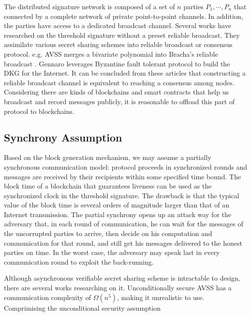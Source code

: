\documentclass[11pt]{article}
\begin{document}
The distributed signature network is composed of a set of $n$ parties $P_1, \cdots, P_n$ that connected by a complete network of private point-to-point channels. In addition, the parties have access to a dedicated broadcast channel. Several works\cite{kate2009distributed,kate2012distributed,cachin2002asynchronous} have researched on the threshold signature without a preset reliable broadcast. They assimilate various secret sharing schemes into reliable broadcast or consensus protocol. e.g. AVSS\cite{cachin2002asynchronous} merges a bivariate polynomial into Bracha’s reliable broadcast \cite{bracha1984asynchronous}. Gennaro\cite{gennaro2007secure} leverages Byzantine fault tolerant protocol\cite{castro1999practical} to build the DKG for the Internet. It can be concluded from these articles that constructing a reliable broadcast channel is equivalent to reaching a consensus among nodes. Considering there are kinds of blockchains and smart contracts that help us broadcast and record messages publicly, it is reasonable to offload this part of protocol to blockchains.

\subsection{Synchrony Assumption}

Based on the block generation mechanism, we may assume a partially synchronous communication model: protocol proceeds in synchronized rounds and messages are received by their recipients within some specified time bound. The block time of a blockchain that guarantees liveness can be used as the synchronized clock in the threshold signature. The drawback is that the typical value of the block time is several orders of magnitude larger than that of an Internet transmission. The partial synchrony opens up an attack way for the adversary that, in each round of communication, he can wait for the messages of the uncorrupted parties to arrive, then decide on his computation and communication for that round, and still get his messages delivered to the honest parties on time. In the worst case, the adversary may speak last in every communication round to exploit the back-running.

Although asynchronous verifiable secret sharing scheme is intractable to design, there are several works researching on it. Unconditionally secure AVSS has a communication complexity of $\Omega(n^5)$, making it unrealistic to use. Comprimising the unconditional security assumption 
\end{document}
